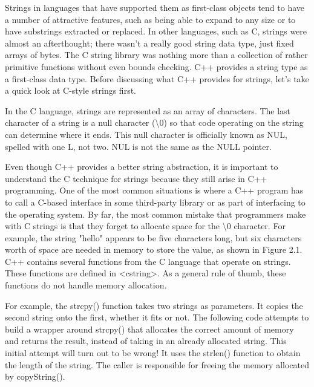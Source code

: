 
Strings in languages that have supported them as first-class objects tend to have a number of attractive features, such as being able to expand to any size or to have substrings extracted or replaced. In other languages, such as C, strings were almost an afterthought; there wasn’t a really good string data type, just fixed arrays of bytes. The C string library was nothing more than a collection of rather primitive functions without even bounds checking. C++ provides a string type as a first-class data type. Before discussing what C++ provides for strings, let’s take a quick look at C-style strings first.



In the C language, strings are represented as an array of characters. The last character of a string is a null character (\textbackslash{}0) so that code operating on the string can determine where it ends. This null character is officially known as NUL, spelled with one L, not two. NUL is not the same as the NULL pointer.

Even though C++ provides a better string abstraction, it is important to understand the C technique for strings because they still arise in C++ programming. One of the most common situations is where a C++ program has to call a C-based interface in some third-party library or as part of interfacing to the operating system.
By far, the most common mistake that programmers make with C strings is that they forget to allocate space for the \textbackslash{}0 character. For example, the string "hello" appears to be five characters long, but six characters worth of space are needed in memory to store the value, as shown in Figure 2.1.
C++ contains several functions from the C language that operate on strings. These functions are defined in <cstring>. As a general rule of thumb, these functions do not handle memory allocation.

For example, the strcpy() function takes two strings as parameters. It copies the second string onto the first, whether it fits or not. The following code attempts to build a wrapper around strcpy() that allocates the correct amount of memory and returns the result, instead of taking in an already allocated string. This initial attempt will turn out to be wrong! It uses the strlen() function to obtain the length of the string. The caller is responsible for freeing the memory allocated by copyString().

